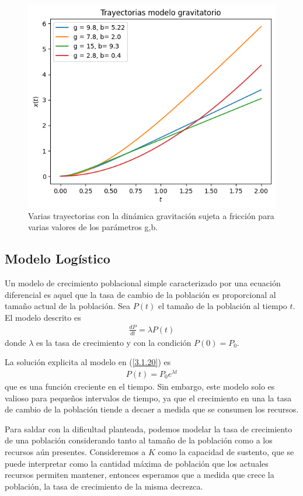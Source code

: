 \begin{figure}
    \centering
    \includegraphics[width = 10 cm]{img/Trayectoria.png}
    \caption{Varias trayectorias con la dinámica gravitación sujeta a fricción para varias valores de los parámetros g,b.}
    \label{fig:trayectoria_gravedad}
\end{figure}

\subsection{Modelo Logístico}

Un modelo de crecimiento poblacional simple caracterizado por una ecuación diferencial es aquel que la tasa de cambio de la población es proporcional al tamaño actual de la población. Sea $P(t)$ el tamaño de la población al tiempo $t$. El modelo descrito es 
\begin{align}
    \frac{dP}{dt} = \lambda P(t)
    \label{3.1.20}
\end{align}
donde $\lambda$ es la tasa de crecimiento y con la condición $P(0) = P_0$. 

La solución explicita al modelo en (\ref{3.1.20}) es
\begin{align}
    P(t) = P_0 e^{\lambda t }
\end{align}
que es una función creciente en el tiempo. Sin embargo, este modelo solo es valioso para pequeños intervalos de tiempo, ya que el crecimiento en una la tasa de cambio de la población tiende a decaer a medida que se consumen los recursos. 

Para saldar con la dificultad planteada, podemos modelar la tasa de crecimiento de una población considerando tanto al tamaño de la población como a los recursos aún presentes. Consideremos a $K$ como la capacidad de sustento, que se puede interpretar como la cantidad máxima de población que los actuales recursos permiten mantener, entonces esperamos que a medida que crece la población, la tasa de crecimiento de la misma decrezca.

